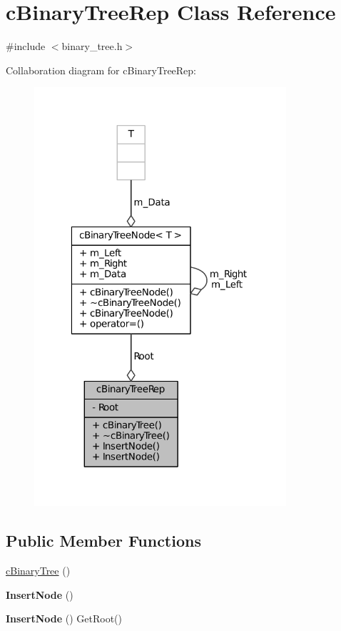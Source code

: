 \hypertarget{classcBinaryTreeRep}{\section{c\-Binary\-Tree\-Rep \-Class \-Reference}
\label{classcBinaryTreeRep}
}


{\ttfamily \#include $<$binary\-\_\-tree.\-h$>$}



\-Collaboration diagram for c\-Binary\-Tree\-Rep\-:\nopagebreak
\begin{figure}[H]
\begin{center}
\leavevmode
\includegraphics[width=265pt]{classcBinaryTreeRep__coll__graph}
\end{center}
\end{figure}
\subsection*{\-Public \-Member \-Functions}
\begin{DoxyCompactItemize}
\item 
\hyperlink{classcBinaryTreeRep_ad2cac2b5d3648b1f11669d579e790ba3}{c\-Binary\-Tree} ()
\item 
\hypertarget{classcBinaryTreeRep_a295b4a582388abcfb65b312a00db2d3e}{{\bfseries \-Insert\-Node} ()}\label{classcBinaryTreeRep_a295b4a582388abcfb65b312a00db2d3e}

\item 
\hypertarget{classcBinaryTreeRep_a9ebebfad24bcf4cbdf88003d0f42c1f6}{{\bfseries \-Insert\-Node} () \-Get\-Root()}\label{classcBinaryTreeRep_a9ebebfad24bcf4cbdf88003d0f42c1f6}

\end{DoxyCompactItemize}
